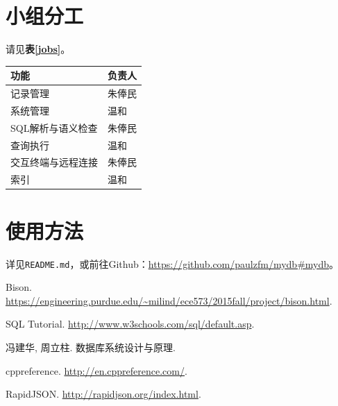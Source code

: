 \documentclass[11pt, a4paper]{article}
\makeatletter
\newcommand\tcaption{\def\@captype{table}\caption}
\newcommand{\tref}[1]{\textbf{表\ref{#1}}}
\makeatother
\begin{document}
\section{小组分工}

请见\tref{jobs}。

\begin{center}
    \tcaption{小组分工}\label{jobs}
    \begin{tabular}{ll}
        \toprule
        功能 & 负责人 \\
        \midrule
        记录管理 & 朱俸民 \\
        系统管理 & 温和 \\
        SQL解析与语义检查 & 朱俸民 \\
        查询执行 & 温和 \\
        交互终端与远程连接 & 朱俸民 \\
        索引 & 温和 \\
        \bottomrule
    \end{tabular}
\end{center}

\section{使用方法}

详见\texttt{README.md}，或前往Github：\url{https://github.com/paulzfm/mydb#mydb}。

\renewcommand{\refname}{参考资料}

\begin{thebibliography}{9}

 Bison. \url{https://engineering.purdue.edu/~milind/ece573/2015fall/project/bison.html}.

 SQL Tutorial. \url{http://www.w3schools.com/sql/default.asp}.

 冯建华, 周立柱. 数据库系统设计与原理. 

 cppreference. \url{http://en.cppreference.com/}.

 RapidJSON. \url{http://rapidjson.org/index.html}.

\end{thebibliography}
\end{document}
